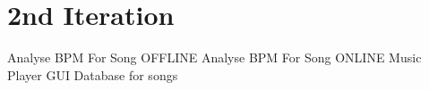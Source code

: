 \section{2nd Iteration}
Analyse BPM For Song OFFLINE
Analyse BPM For Song ONLINE
Music Player GUI 
Database for songs